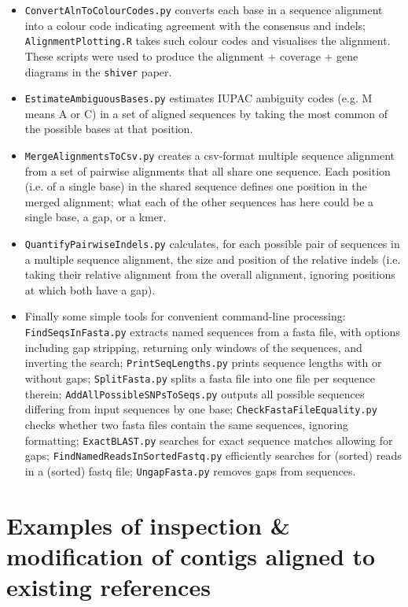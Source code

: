 \documentclass{article}
\newcommand{\shiv}{\c{shiver}\xspace}
\let\c\texttt
\begin{document}
\begin{itemize}
\item \c{ConvertAlnToColourCodes.py} converts each base in a sequence alignment into a colour code indicating agreement with the consensus and indels; \c{AlignmentPlotting.R} takes such colour codes and visualises the alignment.
These scripts were used to produce the alignment + coverage + gene diagrams in the \shiv paper.

\item \c{EstimateAmbiguousBases.py} estimates IUPAC ambiguity codes (e.g. M means A or C) in a set of aligned sequences by taking the most common of the possible bases at that position.

\item \c{MergeAlignmentsToCsv.py} creates a csv-format multiple sequence alignment from a set of pairwise alignments that all share one sequence.
Each position (i.e. of a single base) in the shared sequence defines one position in the merged alignment; what each of the other sequences has here could be a single base, a gap, or a kmer.

\item \c{QuantifyPairwiseIndels.py} calculates, for each possible pair of sequences in a multiple sequence alignment, the size and position of the relative indels (i.e. taking their relative alignment from the overall alignment, ignoring positions at which both have a gap).

\item Finally some simple tools for convenient command-line processing: \c{FindSeqsInFasta.py} extracts named sequences from a fasta file, with options including gap stripping, returning only windows of the sequences, and inverting the search; \c{PrintSeqLengths.py} prints sequence lengths with or without gaps; \c{SplitFasta.py} splits a fasta file into one file per sequence therein; \c{AddAllPossibleSNPsToSeqs.py} outputs all possible sequences differing from input sequences by one base; \c{CheckFastaFileEquality.py} checks whether two fasta files contain the same sequences, ignoring formatting; \c{ExactBLAST.py} searches for exact sequence matches allowing for gaps; \c{FindNamedReadsInSortedFastq.py} efficiently searches for (sorted) reads in a (sorted) fastq file; \c{UngapFasta.py} removes gaps from sequences.
\end{itemize}


\section{Examples of inspection \& modification of contigs aligned to existing references} \label{sec:ContigAlnExamples}
\end{document}
